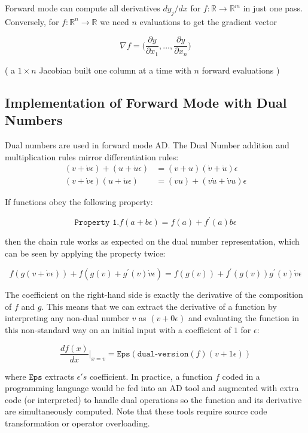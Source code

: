 \documentclass[11pt]{article}
\theoremstyle{definition}
\theoremstyle{plain}
\renewcommand{\b}[1]{\mathbb{#1}}
\begin{document}
\noindent Forward mode can compute all derivatives $d y_j / dx$ for $f: \b{R} \rightarrow \b{R}^m$ in just one pass. Conversely, for $f: \b{R}^n \rightarrow \b{R}$ we need $n$ evaluations
to get the gradient vector

$$ \nabla f = \Big( \frac{\partial y}{\partial x_1},...,\frac{\partial y}{\partial x_n} \Big )$$

\noindent( a $1 \times n$ Jacobian built one column at a time with $n$ forward evaluations )

\newpage

\subsection{Implementation of Forward Mode with Dual Numbers}

\noindent Dual numbers are used in forward mode AD. The Dual Number addition
and multiplication rules mirror differentiation rules:
\begin{align*}
    (v + \dot{v} \epsilon) + (u + \dot{u} \epsilon) &= (v+u) (\dot{v}+\dot{u})\epsilon\\
    (v + \dot{v} \epsilon)(u + \dot{u}\epsilon) &= (vu) + (v \dot{u} + \dot{v} u )\epsilon
\end{align*}

\noindent If functions obey the following property:

$$ \texttt{Property 1.} f(a + b \epsilon) = f(a) + f^\prime(a) b \epsilon$$

\noindent then the chain rule works as expected on the dual number representation, which
can be seen by applying the property twice:

$$ f(g(v + \dot{v}\epsilon)) + f(g(v) + g^\prime(v) \dot{v} \epsilon) =
f(g(v)) + f^\prime(g(v))g^\prime(v) \dot{v} \epsilon $$

\noindent The coefficient on the right-hand side is exactly the derivative of the
composition of $f$ and $g$. 
This means that we can extract the derivative of a function by interpreting
any non-dual number $v$ as $(v + 0 \epsilon)$ and evaluating the function
in this non-standard way on an initial input with a coefficient of $1$ for $\epsilon$:

$$ \frac{d f(x)}{dx} \rvert_{x=v} = \texttt{Eps}(\texttt{dual-version}(f)(v+1\epsilon)) $$

\noindent where $\texttt{Eps}$ extracts $\epsilon's$ coefficient.
In practice, a function $f$ coded in a programming language would be fed
into an AD tool and augmented with extra code (or interpreted) to handle
dual operations so the function and its derivative are simultaneously computed.
Note that these tools require source code transformation or operator overloading.
\end{document}
